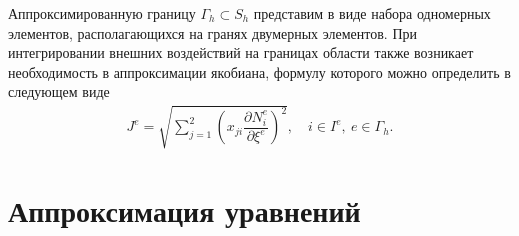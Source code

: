 Аппроксимированную границу $\Gamma_h \subset S_h$ представим в виде набора одномерных элементов, располагающихся на гранях двумерных элементов. При интегрировании внешних воздействий на границах области также возникает необходимость в аппроксимации якобиана, формулу которого можно определить в следующем виде
\begin{gather*}
	J^{e} = \sqrt{
		\sum\limits_{j=1}^{2} 
		\left( 
			x_{ji} \dfrac{\partial N_i^{e}}{\partial \xi^{e}}
		\right)^2
	},
	\quad
	i \in I^{e}, \
	e \in \Gamma_h.
\end{gather*}

\section{Аппроксимация уравнений}\label{sec:NumericalMethods/EquationApproximation}

